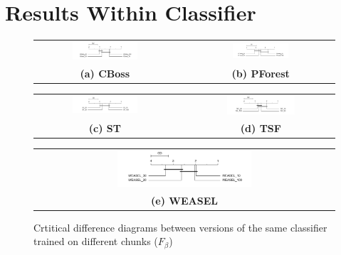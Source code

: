 \section{Results Within Classifier}
\label{AppendixWithin}
\begin{figure} [!htb]
    \centering
    \begin{tabular}{ccc}
    \includegraphics[width=0.49\textwidth]{./Chapters/06 Results/cd_f_score_within_cboss.png} & & 
    \includegraphics[width=0.40\textwidth]{./Chapters/06 Results/cd_f_score_within_pforest.png} \\
    \textbf{(a) CBoss} & & \textbf{(b) PForest} \\[6pt]
    \end{tabular}
    \begin{tabular}{ccc}
    \includegraphics[width=0.49\textwidth]{./Chapters/06 Results/cd_f_score_within_st.png} & & 
    \includegraphics[width=0.49\textwidth]{./Chapters/06 Results/cd_f_score_within_tsf.png} \\
    \textbf{(c) ST} & & \textbf{(d) TSF}  \\[6pt]
    \end{tabular}
    \begin{tabular}{ccc}
    & \includegraphics[width=0.49\textwidth]{./Chapters/06 Results/cd_f_score_within_weasel.png} & \\
    & \textbf{(e) WEASEL} & \\[6pt]
    \end{tabular}
    \caption{Crtitical difference diagrams between versions of the same classifier trained on different chunks ($F_{\beta}$)}
\end{figure}

